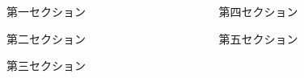 \begin{frame}[t]{}

\begin{columns}[T]
  \begin{column}{.49\linewidth}
    \begin{block}{第一セクション}
      
    \end{block}
    \begin{block}{第二セクション}
      
    \end{block}
    \begin{block}{第三セクション}
      
    \end{block}
    \end{column}
    \begin{column}{.49\linewidth}
    \begin{block}{第四セクション}
      
    \end{block}
    \begin{block}{第五セクション}
      
    \end{block}
  \end{column}
\end{columns}
\end{frame}

